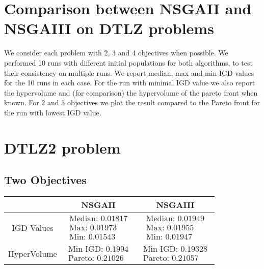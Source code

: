 \documentclass[a4paper,11pt]{article}
\numberwithin{equation}{section}
\begin{document}
 

\section*{Comparison between NSGAII and NSGAIII on DTLZ problems}
\vspace{0.5cm}
We consider each problem with 2, 3 and 4 objectives when possible. We performed 10 runs with different initial populations for both algorithms, to test their consistency on multiple runs. We report median, max and min IGD values for the 10 runs in each case. For the run with minimal IGD value we also report the hypervolume and (for comparison) the hypervolume of the pareto front when known. For 2 and 3 objectives we plot the result compared to the Pareto front for the run with lowest IGD value.

\section{DTLZ2 problem}

\subsection{Two Objectives}

\begin{table}[!h]
\begin{center}
\begin{tabular}{|c|c|c|}
\hline
 & NSGAII & NSGAIII \\
\hline
IGD Values &$\begin{array}{l}
\text{Median: 0.01817}\\
\text{Max: 0.01973}\\
\text{Min: 0.01543}\end{array}$&
$\begin{array}{l}
\text{Median: 0.01949}\\
\text{Max: 0.01955}\\
\text{Min: 0.01947}\end{array}$\\
\hline
HyperVolume &$\begin{array}{l}
\text{Min IGD: 0.1994}\\
\text{Pareto: 0.21026}\end{array}$&
$\begin{array}{l}
\text{Min IGD: 0.19328}\\
\text{Pareto: 0.21057}\end{array}$\\
\hline
\end{tabular}
\end{center}
\end{table}
\end{document}
